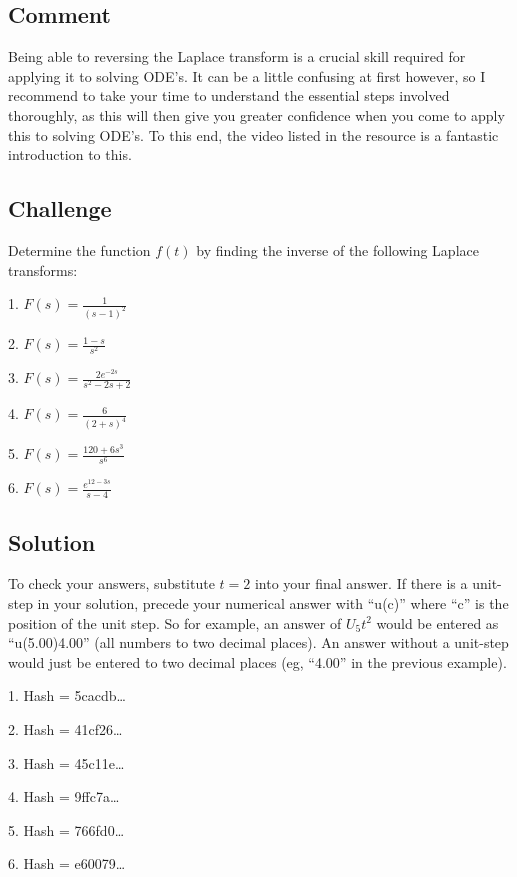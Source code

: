 \subsection*{Comment}
Being able to reversing the Laplace transform is a crucial skill required for applying it to solving ODE's. It can be a little confusing at first however, so I recommend to take your time to understand the essential steps involved thoroughly, as this will then give you greater confidence when you come to apply this to solving ODE's. To this end, the video listed in the resource is a fantastic introduction to this.

\subsection*{Challenge}
Determine the function $f(t)$ by finding the inverse of the following Laplace transforms:

1. $\displaystyle F(s)=\frac{1}{(s-1)^2}$

2. $\displaystyle F(s)=\frac{1-s}{s^2}$

3. $\displaystyle F(s)=\frac{2 e^{-2s}}{s^2-2s+2}$

4. $\displaystyle F(s)=\frac{6}{(2+s)^4}$

5. $\displaystyle F(s)=\frac{120+6s^3}{s^6}$

6. $\displaystyle F(s)=\frac{e^{12-3s}}{s-4}$


\subsection*{Solution}
To check your answers, substitute $t=2$ into your final answer. If there is a unit-step in your solution, precede your numerical answer with ``u(c)'' where ``c'' is the position of the unit step. So for example, an answer of $U_5 t^2$ would be entered as ``u(5.00)4.00'' (all numbers to two decimal places). An answer without a unit-step would just be entered to two decimal places (eg, ``4.00'' in the previous example).

1. Hash = 5cacdb\ldots

2. Hash = 41cf26\ldots

3. Hash = 45c11e\ldots

4. Hash = 9ffc7a\ldots

5. Hash = 766fd0\ldots

6. Hash = e60079\ldots




\newpage

